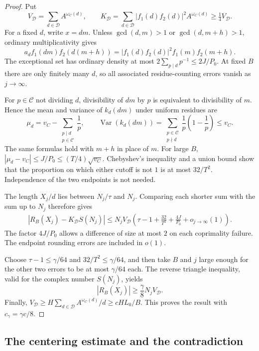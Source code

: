 \begin{proof}
Put
\[
 V_{\mathcal D}=\sum_{d\in\mathcal D}A^{\omega_C(d)},\qquad
 K_{\mathcal D}=\sum_{d\in\mathcal D}
   |f_1(d)f_2(d)|^2A^{\omega_C(d)}\ge\tfrac14 V_{\mathcal D}.
\]
For a fixed $d$, write $x=dm$. Unless
$\gcd(d,m)>1$ or $\gcd(d,m+h)>1$, ordinary multiplicativity gives
\[
 a_df_1(dm)f_2(d(m+h))
   =|f_1(d)f_2(d)|^2f_1(m)f_2(m+h).
\]
The exceptional set has ordinary density at most
$2\sum_{p\mid d}p^{-1}\le2J/P_0$. At fixed $B$ there are only finitely
many $d$, so all associated residue-counting errors vanish as
$j\to\infty$.

For $p\in\mathcal C$ not dividing $d$, divisibility of $dm$ by $p$ is
equivalent to divisibility of $m$. Hence the mean and variance of
$k_d(dm)$ under uniform residues are
\[
 \mu_d=v_C-\sum_{\substack{p\mid d\\p\in\mathcal C}}\frac1p,
 \qquad
 \operatorname{Var}(k_d(dm))
 =\sum_{\substack{p\in\mathcal C\\p\nmid d}}
       \frac1p\left(1-\frac1p\right)\le v_C.
\]
The same formulas hold with $m+h$ in place of $m$. For large $B$,
$|\mu_d-v_C|\le J/P_0\le(T/4)\sqrt{v_C}$. Chebyshev's inequality and
a union bound show that the proportion on which either cutoff is not
$1$ is at most $32/T^2$. Independence of the two endpoints is not needed.

The length $X_j/d$ lies between $N_j/\tau$ and $N_j$. Comparing each
shorter sum with the sum up to $N_j$ therefore gives
\begin{equation}\label{eq:raw-comparison}
 \begin{split}
 |R_B(X_j)-K_{\mathcal D}S(N_j)|
 \le N_jV_{\mathcal D}\left(
 \tau-1+\frac{32}{T^2}+\frac{4J}{P_0}+o_{j\to\infty}(1)\right).
 \end{split}
\end{equation}
The factor $4J/P_0$ allows a difference of size at most $2$ on each
coprimality failure. The endpoint rounding errors are included in $o(1)$.

Choose $\tau-1\le\gamma/64$ and $32/T^2\le\gamma/64$, and then take
$B$ and $j$ large enough for the other two errors to be at most
$\gamma/64$ each. The reverse triangle inequality, valid for the
complex number $S(N_j)$, yields
\[
 |R_B(X_j)|\ge\frac\gamma8N_jV_{\mathcal D}.
\]
Finally,
$V_{\mathcal D}\ge H\sum_{d\in\mathcal D}A^{\omega_C(d)}/d
\ge cHL_0/B$. This proves the result with $c_\gamma=\gamma c/8$.
\end{proof}

\subsection{The centering estimate and the contradiction}

